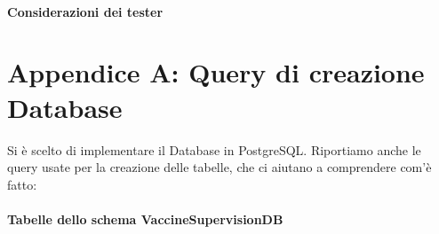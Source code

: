 \documentclass[11pt]{article}
\begin{document}
    \paragraph*{Considerazioni dei tester}
\newpage
    \section*{Appendice A: Query di creazione Database}

    Si è scelto di implementare il Database in PostgreSQL. Riportiamo anche le query usate per la creazione delle tabelle, che ci aiutano a comprendere com'è fatto:
    \paragraph*{Tabelle dello schema VaccineSupervisionDB}
\end{document}
